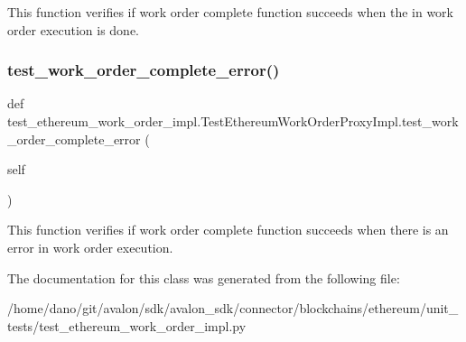 \begin{DoxyVerb}This function verifies if work order complete function
succeeds when the in work order execution is done.
\end{DoxyVerb}
 \mbox{\label{classtest__ethereum__work__order__impl_1_1TestEthereumWorkOrderProxyImpl_a610f6967fb83e2b3f372381d1bf74600}} 
\subsubsection{\texorpdfstring{test\+\_\+work\+\_\+order\+\_\+complete\+\_\+error()}{test\_work\_order\_complete\_error()}}
{\footnotesize\ttfamily def test\+\_\+ethereum\+\_\+work\+\_\+order\+\_\+impl.\+Test\+Ethereum\+Work\+Order\+Proxy\+Impl.\+test\+\_\+work\+\_\+order\+\_\+complete\+\_\+error (\begin{DoxyParamCaption}\item[{}]{self }\end{DoxyParamCaption})}

\begin{DoxyVerb}This function verifies if work order complete function
succeeds when there is an error in work order execution.
\end{DoxyVerb}
 

The documentation for this class was generated from the following file\+:\begin{DoxyCompactItemize}
\item 
/home/dano/git/avalon/sdk/avalon\+\_\+sdk/connector/blockchains/ethereum/unit\+\_\+tests/test\+\_\+ethereum\+\_\+work\+\_\+order\+\_\+impl.\+py\end{DoxyCompactItemize}
